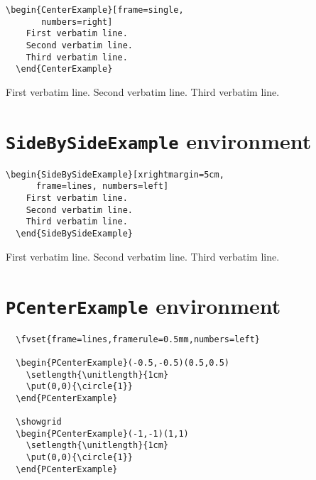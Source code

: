 \documentclass[twoside]{article}
\begin{document}
\begin{changebar}
\begin{Verbatim}[gobble=2]
  \begin{CenterExample}[frame=single,
       numbers=right]
    First verbatim line.
    Second verbatim line.
    Third verbatim line.
  \end{CenterExample}
\end{Verbatim}

\begin{CenterExample}[frame=single,numbers=right]
  First verbatim line.
  Second verbatim line.
  Third verbatim line.
\end{CenterExample}


\section{\texttt{SideBySideExample} environment}

\begin{Verbatim}[gobble=2]
  \begin{SideBySideExample}[xrightmargin=5cm,
      frame=lines, numbers=left]
    First verbatim line.
    Second verbatim line.
    Third verbatim line.
  \end{SideBySideExample}
\end{Verbatim}

\begin{SideBySideExample}[xrightmargin=5cm,frame=single,numbers=left]
  First verbatim line.
  Second verbatim line.
  Third verbatim line.
\end{SideBySideExample}



\iffalse



\section{\texttt{PCenterExample} environment}

\begin{Verbatim}
  \fvset{frame=lines,framerule=0.5mm,numbers=left}

  \begin{PCenterExample}(-0.5,-0.5)(0.5,0.5)
    \setlength{\unitlength}{1cm}
    \put(0,0){\circle{1}}
  \end{PCenterExample}

  \showgrid
  \begin{PCenterExample}(-1,-1)(1,1)
    \setlength{\unitlength}{1cm}
    \put(0,0){\circle{1}}
  \end{PCenterExample}
\end{Verbatim}


\end{changebar}
\end{document}
